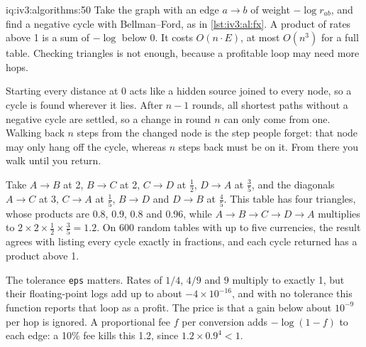 \begin{solution}{iq:iv3:algorithms:50}
Take the graph with an edge $a \to b$ of weight $-\log r_{ab}$, and find a negative cycle with Bellman--Ford, as in \cref{lst:iv3:al:fx}. A product of rates above 1 is a sum of $-\log$ below 0. It costs $O(n \cdot E)$, at most $O(n^3)$ for a full table. Checking triangles is not enough, because a profitable loop may need more hops.
\label{lst:iv3:al:fx}

Starting every distance at 0 acts like a hidden source joined to every node, so a cycle is found wherever it lies. After $n - 1$ rounds, all shortest paths without a negative cycle are settled, so a change in round $n$ can only come from one. Walking back $n$ steps from the changed node is the step people forget: that node may only hang off the cycle, whereas $n$ steps back must be on it. From there you walk until you return.

Take $A \to B$ at 2, $B \to C$ at 2, $C \to D$ at $\tfrac{1}{2}$, $D \to A$ at $\tfrac{3}{5}$, and the diagonals $A \to C$ at 3, $C \to A$ at $\tfrac{1}{5}$, $B \to D$ and $D \to B$ at $\tfrac{4}{5}$. This table has four triangles, whose products are 0.8, 0.9, 0.8 and 0.96, while $A \to B \to C \to D \to A$ multiplies to $2 \times 2 \times \tfrac{1}{2} \times \tfrac{3}{5} = 1.2$. On 600 random tables with up to five currencies, the result agrees with listing every cycle exactly in fractions, and each cycle returned has a product above 1.

The tolerance \texttt{eps} matters. Rates of $1/4$, $4/9$ and $9$ multiply to exactly 1, but their floating-point logs add up to about $-4 \times 10^{-16}$, and with no tolerance this function reports that loop as a profit. The price is that a gain below about $10^{-9}$ per hop is ignored. A proportional fee $f$ per conversion adds $-\log(1 - f)$ to each edge: a 10\% fee kills this 1.2, since $1.2 \times 0.9^4 < 1$.

\end{solution}

